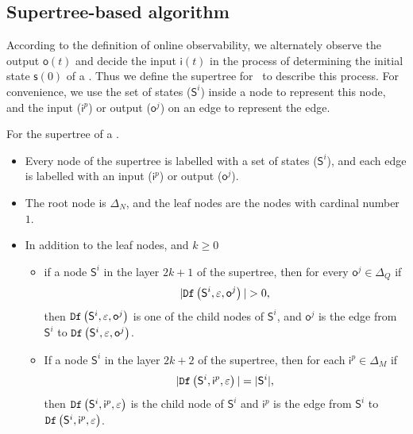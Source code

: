 \subsection{Supertree-based algorithm} 
According to the definition of online observability, we alternately observe the output $\mathsf{o}(t)$ and decide the input $\mathsf{i}(t)$ in the process of determining the initial state $\mathsf{s}(0)$ of a \BCN. Thus we define the supertree for \BCNs\ to describe this process. For convenience, we use the set of states ($\mathsf{S}^i$) inside a node to represent this node, and the input ($\mathsf{i}^p$) or output ($\mathsf{o}^j$) on an edge to represent the edge.
\begin{definition}[Supertree]
For the supertree of a \BCN.   
\begin{itemize}
 \item  Every node of the supertree is labelled with a set of states ($\mathsf{S}^i$), and each edge is labelled with an input ($\mathsf{i}^p$) or output ($\mathsf{o}^j$).
 \item  The root node is $\Delta_N$, and the leaf nodes are the nodes with cardinal number $1$.
 \item In addition to the leaf nodes, and $k\ge0$
 \begin{itemize}
 \item if a node $\mathsf{S}^i$ in the layer $2k + 1$ of the supertree, then for every $\mathsf{o}^j\in \Delta_Q$ if
\[|\Ded\left(\mathsf{S}^i,\varepsilon, \mathsf{o}^j\right)|>0,\]
 then ${\tt Df}\left(\mathsf{S}^i,\varepsilon, \mathsf{o}^j\right)$ is one of the child nodes of $\mathsf{S}^i$, and $\mathsf{o}^j$ is the edge from $\mathsf{S}^i$ to ${\tt Df}\left(\mathsf{S}^i,\varepsilon, \mathsf{o}^j\right)$.
 \item If a node $\mathsf{S}^i$ in the layer $2k+2$ of the supertree, then for each $\mathsf{i}^p \in \Delta_M$ if
\[|{\tt Df}\left(\mathsf{S}^i,\mathsf{i}^p,\varepsilon\right)|=|\mathsf{S}^i|,\] 
then ${\tt Df}\left(\mathsf{S}^i,\mathsf{i}^p,\varepsilon\right)$ is the child node of $\mathsf{S}^i$ and $\mathsf{i}^p$ is the edge from $\mathsf{S}^i$ to ${\tt Df}\left(\mathsf{S}^i,\mathsf{i}^p,\varepsilon\right)$. 
 \end{itemize}
 
  
 \end{itemize}
\label{def:super-tree}
\end{definition}

